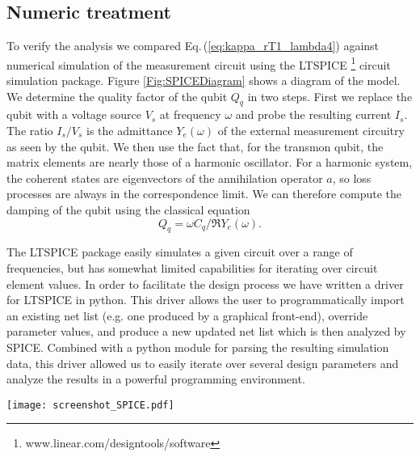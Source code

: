 \subsection{Numeric treatment}

To verify the analysis we compared Eq.\,(\ref{eq:kappa_rT1_lambda4}) against numerical simulation of the measurement circuit using the LTSPICE \footnote{www.linear.com/designtools/software} circuit simulation package.
Figure \ref{Fig:SPICEDiagram} shows a diagram of the model.
We determine the quality factor of the qubit $Q_q$ in two steps.
First we replace the qubit with a voltage source $V_s$ at frequency $\omega$ and probe the resulting current $I_s$.
The ratio $I_s / V_s$ is the admittance $Y_e(\omega)$ of the external measurement circuitry as seen by the qubit.
We then use the fact that, for the transmon qubit, the matrix elements are nearly those of a harmonic oscillator.
For a harmonic system, the coherent states are eigenvectors of the annihilation operator $a$, so loss processes are always in the correspondence limit.
We can therefore compute the damping of the qubit using the classical equation \cite{Esteve:dissipation1986}  \begin{equation}
Q_q = \omega C_q / \Re{Y_e(\omega)}. \label{eq:Q_qAdmittance} \end{equation}

The LTSPICE package easily simulates a given circuit over a range of frequencies, but has somewhat limited capabilities for iterating over circuit element values.
In order to facilitate the design process we have written a driver for LTSPICE in python.
This driver allows the user to programmatically import an existing net list (e.g. one produced by a graphical front-end), override parameter values, and produce a new updated net list which is then analyzed by SPICE.
Combined with a python module for parsing the resulting simulation data, this driver allowed us to easily iterate over several design parameters and analyze the results in a powerful programming environment.

\begin{figure*}
\begin{centering}
\texttt{[image: screenshot\_SPICE.pdf]}
\par\end{centering}
\caption{Screen capture of the SPICE model. The qubit is replaced by a voltage source which is activated with an ac signal of amplitude $V_s$ at variable frequency $\omega$. The current $I_s$ through the source is probed and the admittance of the external circuit computed as $Y_e(\omega)=I_s / V_s$. Note that the filter $\lambda/4$ transmission line resonator is not drawn to scale; the end which connects to ground is physically shorter than the other section.}
\label{Fig:SPICEDiagram}
\end{figure*}

